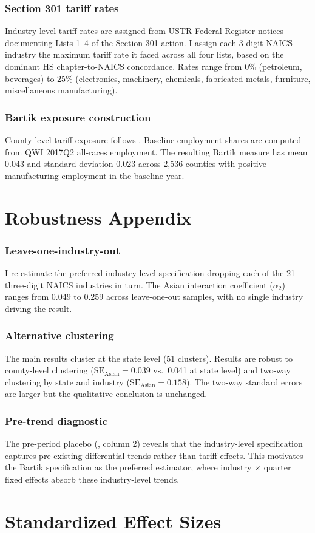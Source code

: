 \documentclass[12pt]{article}
\begin{document}
\subsubsection*{Section 301 tariff rates} Industry-level tariff rates are assigned from USTR Federal Register notices documenting Lists 1--4 of the Section 301 action. I assign each 3-digit NAICS industry the maximum tariff rate it faced across all four lists, based on the dominant HS chapter-to-NAICS concordance. Rates range from 0\% (petroleum, beverages) to 25\% (electronics, machinery, chemicals, fabricated metals, furniture, miscellaneous manufacturing).

\subsubsection*{Bartik exposure construction} County-level tariff exposure follows . Baseline employment shares are computed from QWI 2017Q2 all-races employment. The resulting Bartik measure has mean 0.043 and standard deviation 0.023 across 2,536 counties with positive manufacturing employment in the baseline year.


\section{Robustness Appendix}

\subsubsection*{Leave-one-industry-out} I re-estimate the preferred industry-level specification dropping each of the 21 three-digit NAICS industries in turn. The Asian interaction coefficient ($\alpha_2$) ranges from 0.049 to 0.259 across leave-one-out samples, with no single industry driving the result.

\subsubsection*{Alternative clustering} The main results cluster at the state level (51 clusters). Results are robust to county-level clustering ($\text{SE}_{\text{Asian}} = 0.039$ vs.\ 0.041 at state level) and two-way clustering by state and industry ($\text{SE}_{\text{Asian}} = 0.158$). The two-way standard errors are larger but the qualitative conclusion is unchanged.

\subsubsection*{Pre-trend diagnostic} The pre-period placebo (, column 2) reveals that the industry-level specification captures pre-existing differential trends rather than tariff effects. This motivates the Bartik specification as the preferred estimator, where industry $\times$ quarter fixed effects absorb these industry-level trends.


\section{Standardized Effect Sizes}
\label{sec:sde}


\end{document}
